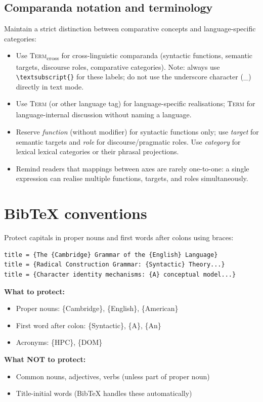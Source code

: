 \documentclass[12pt]{article}
\begin{document}
\subsection{Comparanda notation and terminology}
Maintain a strict distinction between comparative concepts and language-specific categories:
\begin{itemize}[nosep]
  \item Use \textsc{Term}\textsubscript{cross} for cross-linguistic comparanda (syntactic functions, semantic targets, discourse roles, comparative categories). Note: always use \verb|\textsubscript{}| for these labels; do not use the underscore character (\_) directly in text mode.
  \item Use \textsc{Term}\textsubscript{} (or other language tag) for language-specific realisations; \textsc{Term}\textsubscript{} for language-internal discussion without naming a language.
  \item Reserve \emph{function} (without modifier) for syntactic functions only; use \emph{target} for semantic targets and \emph{role} for discourse/pragmatic roles. Use \emph{category} for lexical lexical categories or their phrasal projections.
  \item Remind readers that mappings between axes are rarely one-to-one: a single expression can realise multiple functions, targets, and roles simultaneously.
\end{itemize}

\section{BibTeX conventions}\label{bibtex}
Protect capitals in proper nouns and first words after colons using braces:

\begin{verbatim}
title = {The {Cambridge} Grammar of the {English} Language}
title = {Radical Construction Grammar: {Syntactic} Theory...}
title = {Character identity mechanisms: {A} conceptual model...}
\end{verbatim}

\textbf{What to protect:}
\begin{itemize}[nosep]
  \item Proper nouns: \{Cambridge\}, \{English\}, \{American\}
  \item First word after colon: \{Syntactic\}, \{A\}, \{An\}
  \item Acronyms: \{HPC\}, \{DOM\}
\end{itemize}

\textbf{What NOT to protect:}
\begin{itemize}[nosep]
  \item Common nouns, adjectives, verbs (unless part of proper noun)
  \item Title-initial words (BibTeX handles these automatically)
\end{itemize}

\clearpage
\printbibliography
\end{document}
